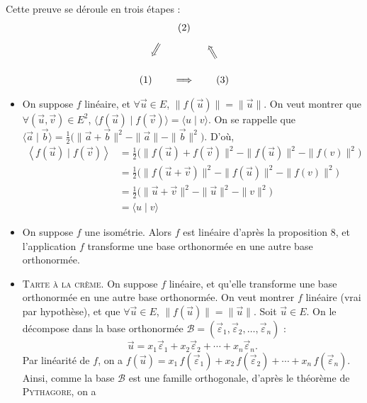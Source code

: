 \begin{prv}
	Cette preuve se déroule en trois étapes : \[
		\begin{array}{ccccc}
			&&(2)&&\\[2mm]
			&\rotatebox{60}{$\impliedby$}&&&\\[-10mm]
			&&&\rotatebox{-60}{$\impliedby$}&\\
			&&&&\\
			\mathrlap{(1)}&&\implies&&\mathllap{(3)}
		\end{array}
	\]
	\begin{itemize}
		\item On suppose $f$\/ linéaire, et $\forall \vec{u} \in E$, $\|f(\vec{u})\| = \|\vec{u}\|$.
			On veut montrer que $\forall (\vec{u},\vec{v}) \in E^2$, $\langle f(\vec{u})  \mid f(\vec{v})\rangle = \langle u  \mid v \rangle$.
			On se rappelle que $\langle \vec{a}\mid  \vec{b}\rangle = \frac{1}{2}\big(\|\vec{a} + \vec{b}\|^2 - \|\vec{a}\| - \|\vec{b}\|^2\big)$.
			D'où,
			\begin{align*}
				\left<f(\vec{u})  \mid f(\vec{v}) \right>
				&= \frac{1}{2} \big(\|f(\vec{u}) + f(\vec{v})\|^2 - \|f(\vec{u})\|^2 - \|f(v)\|^2\big) \\
				&= \frac{1}{2} \big(\|f(\vec{u}+\vec{v})\|^2 - \|f(\vec{u})\|^2 - \|f(v)\|^2\big) \\
				&= \frac{1}{2} \big(\|\vec{u}+\vec{v}\|^2 - \|\vec{u}\|^2 - \|v\|^2\big) \\
				&= \langle u  \mid  v \rangle
			\end{align*}
		\item On suppose $f$\/ une isométrie. Alors $f$\/ est linéaire d'après la proposition 8, et l'application $f$\/ transforme une base orthonormée en une autre base orthonormée.
		\item \textsc{\color{cyan}\danger\: Tarte à la crème.} On suppose $f$\/ linéaire, et qu'elle transforme une base orthonormée en une autre base orthonormée.	
			On veut montrer $f$\/ linéaire (vrai par hypothèse), et que $\forall \vec{u} \in E$, $\|f(\vec{u})\| = \|\vec{u}\|$.
			Soit $\vec{u} \in E$. On le décompose dans la base orthonormée $\mathcal{B} = (\vec{\varepsilon}_1, \vec{\varepsilon}_2, \ldots, \vec{\varepsilon}_n)$ : \[
				\vec{u} = x_1 \vec{\varepsilon}_1 + x_2 \vec{\varepsilon}_2 + \cdots + x_n \vec{\varepsilon}_n
			.\] Par linéarité de $f$, on a $f(\vec{u}) = x_1\, f(\vec{\varepsilon}_1) + x_2\, f(\vec{\varepsilon}_2) + \cdots + x_n\, f(\vec{\varepsilon}_n)$.
			Ainsi, comme la base $\mathcal{B}$\/ est une famille orthogonale, d'après le théorème de \textsc{Pythagore}, on a

\end{itemize}
\end{prv}
